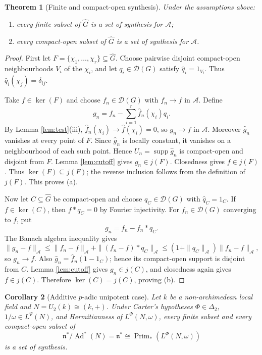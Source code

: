 \documentclass[11pt]{article}
\newtheorem{theorem}{Theorem}
\newtheorem{corollary}[theorem]{Corollary}
\newcommand{\A}{\mathcal A}
\newcommand{\D}{\mathcal D}
\newcommand{\wideG}{\widehat G}
\begin{document}
\begin{theorem}[Finite and compact-open synthesis]\label{thm:main}
Under the assumptions above:
\begin{enumerate}[label=\textup{(\alph*)}]
\item every finite subset of $\wideG$ is a set of synthesis for $\A$;
\item every compact-open subset of $\wideG$ is a set of synthesis for $\A$.
\end{enumerate}
\end{theorem}

\begin{proof}
First let $F=\{\chi_1,\ldots,\chi_r\}\subseteq\wideG$.  Choose pairwise
disjoint compact-open neighbourhoods $V_i$ of the $\chi_i$, and let
$q_i\in\D(G)$ satisfy $\widehat q_i=1_{V_i}$.  Thus
$\widehat q_i(\chi_j)=\delta_{ij}$.

Take $f\in\ker(F)$ and choose $f_n\in\D(G)$ with $f_n\to f$ in $\A$.  Define
\[
 g_n=f_n-\sum_{i=1}^r\widehat f_n(\chi_i)q_i.
\]
By Lemma \ref{lem:test}(iii), $\widehat f_n(\chi_i)\to\widehat f(\chi_i)=0$,
so $g_n\to f$ in $\A$.  Moreover $\widehat g_n$ vanishes at every point of
$F$.  Since $\widehat g_n$ is locally constant, it vanishes on a neighbourhood
of each such point.  Hence
$U_n=\operatorname{supp}\widehat g_n$ is compact-open and disjoint from $F$.
Lemma \ref{lem:cutoff} gives $g_n\in j(F)$.  Closedness gives
$f\in j(F)$.  Thus $\ker(F)\subseteq j(F)$; the reverse inclusion follows
from the definition of $j(F)$.  This proves (a).

Now let $C\subseteq\wideG$ be compact-open and choose $q_C\in\D(G)$ with
$\widehat q_C=1_C$.  If $f\in\ker(C)$, then $f*q_C=0$ by Fourier injectivity.
For $f_n\in\D(G)$ converging to $f$, put
\[
 g_n=f_n-f_n*q_C.
\]
The Banach algebra inequality gives
\[
 \|g_n-f\|_\A
 \leq \|f_n-f\|_\A+\|(f_n-f)*q_C\|_\A
 \leq (1+\|q_C\|_\A)\|f_n-f\|_\A,
\]
so $g_n\to f$.  Also $\widehat g_n=\widehat f_n(1-1_C)$; hence its compact-open
support is disjoint from $C$.  Lemma \ref{lem:cutoff} gives
$g_n\in j(C)$, and closedness again gives $f\in j(C)$.  Therefore
$\ker(C)=j(C)$, proving (b).
\end{proof}

\begin{corollary}[Additive $p$-adic unipotent case]
Let $k$ be a non-archimedean local field and
$N=U_2(k)\cong(k,+)$.  Under Carter's hypotheses
$\Phi\in\Delta_2$, $1/\omega\in L^\Psi(N)$, and Hermitianness of
$L^\Phi(N,\omega)$, every finite subset and every compact-open subset of
\[
 \mathfrak n^*/\operatorname{Ad}^*(N)=\mathfrak n^*
 \cong \operatorname{Prim}_*(L^\Phi(N,\omega))
\]
is a set of synthesis.
\end{corollary}
\end{document}
